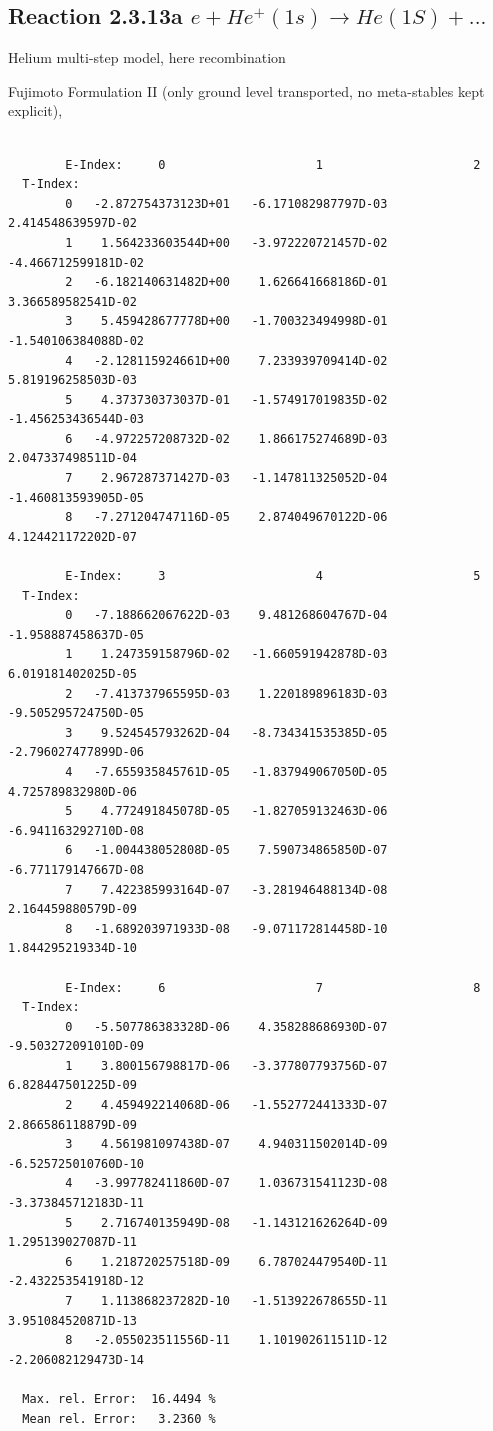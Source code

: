 \documentclass[12pt,dvips]{article}
\begin{document}
\subsection{
Reaction 2.3.13a  $e + He^+(1s) \rightarrow He(1S) + ...  $
}

Helium multi-step model, here recombination

 Fujimoto Formulation II (only ground level transported, no meta-stables kept
explicit), \cite{kn:Fujimoto}


\begin{small}\begin{verbatim}

        E-Index:     0                     1                     2
  T-Index:
        0   -2.872754373123D+01   -6.171082987797D-03    2.414548639597D-02
        1    1.564233603544D+00   -3.972220721457D-02   -4.466712599181D-02
        2   -6.182140631482D+00    1.626641668186D-01    3.366589582541D-02
        3    5.459428677778D+00   -1.700323494998D-01   -1.540106384088D-02
        4   -2.128115924661D+00    7.233939709414D-02    5.819196258503D-03
        5    4.373730373037D-01   -1.574917019835D-02   -1.456253436544D-03
        6   -4.972257208732D-02    1.866175274689D-03    2.047337498511D-04
        7    2.967287371427D-03   -1.147811325052D-04   -1.460813593905D-05
        8   -7.271204747116D-05    2.874049670122D-06    4.124421172202D-07

        E-Index:     3                     4                     5
  T-Index:
        0   -7.188662067622D-03    9.481268604767D-04   -1.958887458637D-05
        1    1.247359158796D-02   -1.660591942878D-03    6.019181402025D-05
        2   -7.413737965595D-03    1.220189896183D-03   -9.505295724750D-05
        3    9.524545793262D-04   -8.734341535385D-05   -2.796027477899D-06
        4   -7.655935845761D-05   -1.837949067050D-05    4.725789832980D-06
        5    4.772491845078D-05   -1.827059132463D-06   -6.941163292710D-08
        6   -1.004438052808D-05    7.590734865850D-07   -6.771179147667D-08
        7    7.422385993164D-07   -3.281946488134D-08    2.164459880579D-09
        8   -1.689203971933D-08   -9.071172814458D-10    1.844295219334D-10

        E-Index:     6                     7                     8
  T-Index:
        0   -5.507786383328D-06    4.358288686930D-07   -9.503272091010D-09
        1    3.800156798817D-06   -3.377807793756D-07    6.828447501225D-09
        2    4.459492214068D-06   -1.552772441333D-07    2.866586118879D-09
        3    4.561981097438D-07    4.940311502014D-09   -6.525725010760D-10
        4   -3.997782411860D-07    1.036731541123D-08   -3.373845712183D-11
        5    2.716740135949D-08   -1.143121626264D-09    1.295139027087D-11
        6    1.218720257518D-09    6.787024479540D-11   -2.432253541918D-12
        7    1.113868237282D-10   -1.513922678655D-11    3.951084520871D-13
        8   -2.055023511556D-11    1.101902611511D-12   -2.206082129473D-14

  Max. rel. Error:  16.4494 %
  Mean rel. Error:   3.2360 %
\end{verbatim}\end{small}
\end{document}
